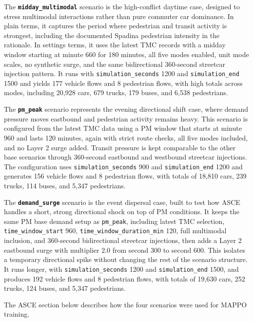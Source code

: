 \documentclass{article}
\begin{document}
The \textbf{\texttt{midday\_multimodal}} scenario is the high-conflict daytime case, designed to stress multimodal interactions rather than pure commuter car dominance. In plain terms, it captures the period where pedestrian and transit activity is strongest, including the documented Spadina pedestrian intensity in the rationale. In settings terms, it uses the latest TMC records with a midday window starting at minute 660 for 180 minutes, all five modes enabled, unit mode scales, no synthetic surge, and the same bidirectional 360-second streetcar injection pattern. It runs with \texttt{simulation\_seconds} 1200 and \texttt{simulation\_end} 1500 and yields 177 vehicle flows and 8 pedestrian flows, with high totals across modes, including 20{,}928 cars, 679 trucks, 179 buses, and 6{,}538 pedestrians.

The \textbf{\texttt{pm\_peak}} scenario represents the evening directional shift case, where demand pressure moves eastbound and pedestrian activity remains heavy. This scenario is configured from the latest TMC data using a PM window that starts at minute 960 and lasts 120 minutes, again with strict route checks, all five modes included, and no Layer 2 surge added. Transit pressure is kept comparable to the other base scenarios through 360-second eastbound and westbound streetcar injections. The configuration uses \texttt{simulation\_seconds} 900 and \texttt{simulation\_end} 1200 and generates 156 vehicle flows and 8 pedestrian flows, with totals of 18{,}810 cars, 239 trucks, 114 buses, and 5{,}347 pedestrians.

The \textbf{\texttt{demand\_surge}} scenario is the event dispersal case, built to test how ASCE handles a short, strong directional shock on top of PM conditions. It keeps the same PM base demand setup as \texttt{pm\_peak}, including latest TMC selection, \texttt{time\_window\_start} 960, \texttt{time\_window\_duration\_min} 120, full multimodal inclusion, and 360-second bidirectional streetcar injections, then adds a Layer 2 eastbound surge with multiplier 2.0 from second 300 to second 600. This isolates a temporary directional spike without changing the rest of the scenario structure. It runs longer, with \texttt{simulation\_seconds} 1200 and \texttt{simulation\_end} 1500, and produces 192 vehicle flows and 8 pedestrian flows, with totals of 19{,}630 cars, 252 trucks, 124 buses, and 5{,}347 pedestrians.

The ASCE section below describes how the four scenarios were used for MAPPO training.
\end{document}
